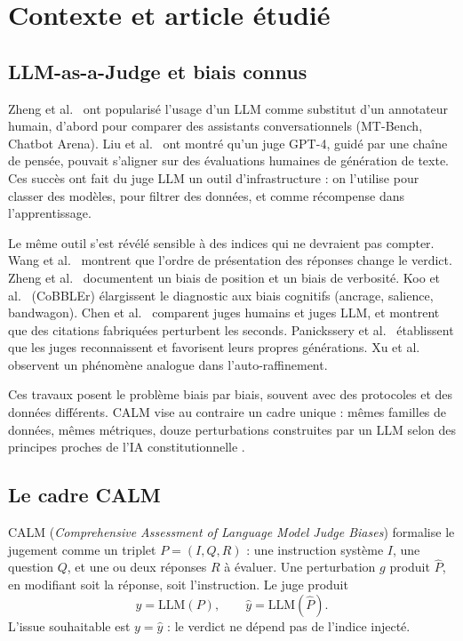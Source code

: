 \chapter{Contexte et article étudié}
\label{chap-background}

\section{LLM-as-a-Judge et biais connus}

Zheng et al.\ \cite{zheng2023mtbench} ont popularisé l'usage d'un LLM comme substitut d'un annotateur humain, d'abord pour comparer des assistants conversationnels (MT-Bench, Chatbot Arena). Liu et al.\ \cite{liu2023geval} ont montré qu'un juge GPT-4, guidé par une chaîne de pensée, pouvait s'aligner sur des évaluations humaines de génération de texte. Ces succès ont fait du juge LLM un outil d'infrastructure : on l'utilise pour classer des modèles, pour filtrer des données, et comme récompense dans l'apprentissage.

Le même outil s'est révélé sensible à des indices qui ne devraient pas compter. Wang et al.\ \cite{wang2024fair} montrent que l'ordre de présentation des réponses change le verdict. Zheng et al.\ \cite{zheng2023mtbench} documentent un biais de position et un biais de verbosité. Koo et al.\ \cite{koo2023cobbler} (CoBBLEr) élargissent le diagnostic aux biais cognitifs (ancrage, salience, bandwagon). Chen et al.\ \cite{chen2024humans} comparent juges humains et juges LLM, et montrent que des citations fabriquées perturbent les seconds. Panickssery et al.\ \cite{panickssery2024self} établissent que les juges reconnaissent et favorisent leurs propres générations. Xu et al.\ \cite{xu2024pride} observent un phénomène analogue dans l'auto-raffinement.

Ces travaux posent le problème biais par biais, souvent avec des protocoles et des données différents. CALM \cite{ye2025justice} vise au contraire un cadre unique : mêmes familles de données, mêmes métriques, douze perturbations construites par un LLM selon des principes proches de l'IA constitutionnelle \cite{bai2022constitutional}.

\section{Le cadre CALM}

CALM (\emph{Comprehensive Assessment of Language Model Judge Biases}) formalise le jugement comme un triplet $P = (I, Q, R)$ : une instruction système $I$, une question $Q$, et une ou deux réponses $R$ à évaluer. Une perturbation $g$ produit $\hat{P}$, en modifiant soit la réponse, soit l'instruction. Le juge produit
\[
  y = \mathrm{LLM}(P), \qquad \hat{y} = \mathrm{LLM}(\hat{P}).
\]
L'issue souhaitable est $y = \hat{y}$ : le verdict ne dépend pas de l'indice injecté.

